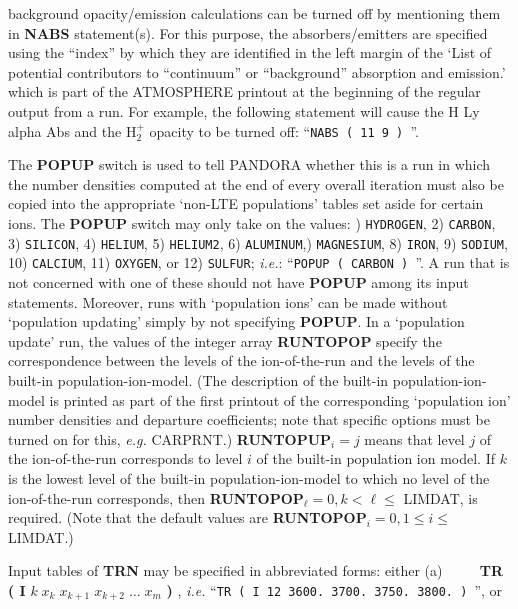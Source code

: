 background opacity/emission
calculations can be turned off by mentioning them in {\bf NABS} statement(s).
For this purpose, the absorbers/emitters are specified using the ``index''
by which they are identified in the left margin of the `List of potential
contributors to ``continuum'' or ``background'' absorption and
emission.' which is part of the ATMOSPHERE printout at the beginning of
the regular output from a run. For example, the following statement
will cause the H Ly alpha Abs and the H$_2^+$
opacity to be turned off: ``{\tt NABS ( 11 9 ) }''.
\blankline
\blankline
\centerline{}
\space \noindent
The {\bf POPUP} switch is used to tell PANDORA whether this is a run in which
the number densities computed at the end of every overall iteration must also
be copied into the appropriate `non-LTE populations' tables set aside for
certain ions. The {\bf POPUP} switch may only take on the values: ) {\tt HYDROGEN}, 2) {\tt CARBON}, 3) {\tt SILICON}, 4) {\tt HELIUM},
5) {\tt HELIUM2}, 6) {\tt ALUMINUM},) {\tt MAGNESIUM}, 8) {\tt IRON}, 9) {\tt SODIUM}, 10) {\tt CALCIUM},
11) {\tt OXYGEN}, or 12) {\tt SULFUR}; \np
{\it i.e.}: ``{\tt POPUP ( CARBON ) }''.
A run that is not concerned with one of these should not have {\bf POPUP}
among its input statements. Moreover, runs with `population ions' can be
made without `population updating' simply by not specifying {\bf POPUP}. \np
In a `population update' run, the values of the integer array {\bf RUNTOPOP}
specify the correspondence between the levels of the ion-of-the-run and the
levels of the built-in population-ion-model. (The description of the built-in
population-ion-model is printed as part of the first printout of the 
corresponding `population ion' number densities and departure coefficients;
note that specific options must be turned on for this, {\it e.g.} CARPRNT.)
{\bf RUNTOPUP}$_i = j$ means that level $j$ of the ion-of-the-run
corresponds to level $i$ of the built-in population ion model. \np
If $k$ is the lowest level of the built-in population-ion-model to which
no level of the ion-of-the-run corresponds, then {\bf RUNTOPOP}$_\ell = 0, 
k < \ell \leq $ LIMDAT, is required. (Note that the default values are
{\bf RUNTOPOP}$_i = 0, 1 \leq i \leq $ LIMDAT.)
\ej
\centerline{}
\space \noindent
Input tables of {\bf TRN} may be specified in abbreviated forms: either \np
(a) $\qquad$
{\bf TR ( I} $k \; x_k \; x_{k+1} \; x_{k+2} \; \ldots 
\; x_m$ {\bf ) },\np
{\it i.e.} ``{\tt TR ( I 12 3600. 3700. 3750. 3800. ) }'', or \np
